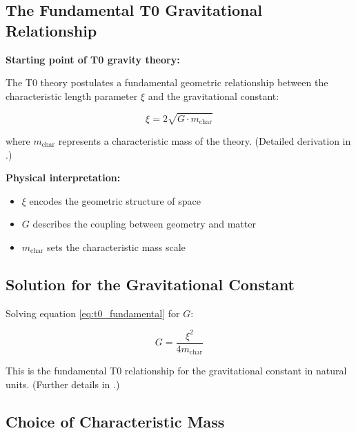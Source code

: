 	\subsection{The Fundamental T0 Gravitational Relationship}
	
	\begin{derivation}
		\textbf{Starting point of T0 gravity theory:}
		
		The T0 theory postulates a fundamental geometric relationship between the characteristic length parameter $\xi$ and the gravitational constant:
		
		\begin{equation}
			\xi = 2\sqrt{G \cdot m_{\text{char}}}
			\label{eq:t0_fundamental}
		\end{equation}
		
		where $m_{\text{char}}$ represents a characteristic mass of the theory. (Detailed derivation in \cite{T0_gravitational_constant_En}.)
		
		\textbf{Physical interpretation:}
		\begin{itemize}
			\item $\xi$ encodes the geometric structure of space
			\item $G$ describes the coupling between geometry and matter
			\item $m_{\text{char}}$ sets the characteristic mass scale
		\end{itemize}
	\end{derivation}
	
	\subsection{Solution for the Gravitational Constant}
	
	Solving equation \eqref{eq:t0_fundamental} for $G$:
	
	\begin{equation}
		\boxed{G = \frac{\xi^2}{4 m_{\text{char}}}}
		\label{eq:g_fundamental}
	\end{equation}
	
	This is the fundamental T0 relationship for the gravitational constant in natural units. (Further details in \cite{gravitational_constant_En}.)
	
	\subsection{Choice of Characteristic Mass}
	
